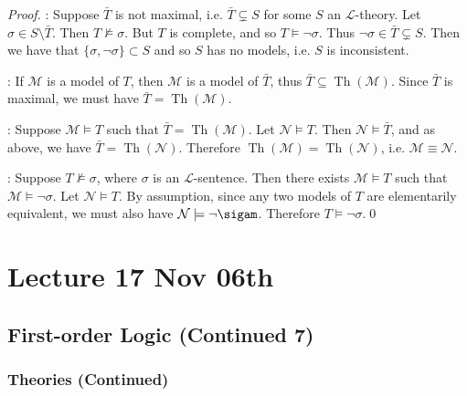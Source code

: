 \documentclass[notoc,notitlepage]{tufte-book}
\DeclareMathOperator{\Th}{Th }
\begin{document}
\begin{proof}
  : Suppose $\bar{T}$ is not maximal, i.e. $\bar{T} \subsetneq S$  for some $S$ an $\mathcal{L}$-theory. Let $\sigma \in S \setminus \bar{T}$. Then $T \not\models \sigma$. But $T$ is complete, and so $T \models \neg \sigma$. Thus $\neg \sigma \in \bar{T} \subsetneq S$. Then we have that $\{ \sigma, \neg \sigma \} \subset S$ and so $S$ has no models, i.e. $S$ is inconsistent.

  \noindent{}: If $\mathcal{M}$ is a model of $T$, then $\mathcal{M}$ is a model of $\bar{T}$, thus $\bar{T} \subseteq \Th(\mathcal{M})$. Since $\bar{T}$ is maximal, we must have $\bar{T} = \Th(\mathcal{M})$.

  \noindent{}: Suppose $\mathcal{M} \models T$ such that $\bar{T} = \Th(\mathcal{M})$. Let $\mathcal{N} \models T$. Then $\mathcal{N} \models \bar{T}$, and as above, we have $\bar{T} = \Th(\mathcal{N})$. Therefore $\Th(\mathcal{M}) = \Th(\mathcal{N})$, i.e. $\mathcal{M} \equiv \mathcal{N}$.

  \noindent{}: Suppose $T \not\models \sigma$, where $\sigma$ is an $\mathcal{L}$-sentence. Then there exists $\mathcal{M} \models T$ such that $\mathcal{M} \models \neg \sigma$. Let $\mathcal{N} \models T$. By assumption, since any two models of $T$ are elementarily equivalent, we must also have $\mathcal{N} \models \neg \sigam$. Therefore $T \models \neg \sigma$.\qed\
\end{proof}




\chapter{Lecture 17 Nov 06th}%
\label{chp:lecture_17_nov_06th}

\section{First-order Logic (Continued 7)}%
\label{sec:first_order_logic_continued_7}

\subsection{Theories (Continued)}%
\label{sub:theories_continued}
\end{document}
